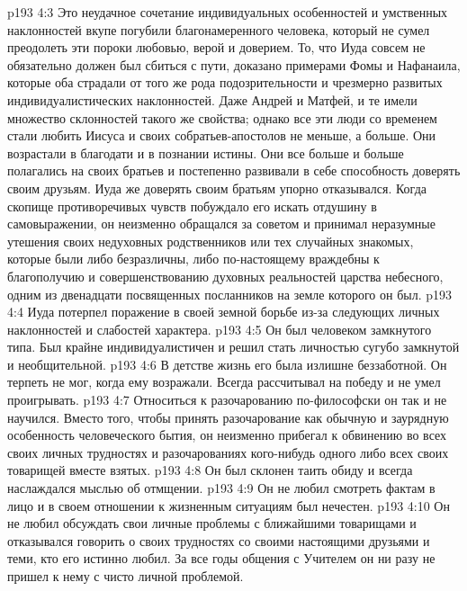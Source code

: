 \vs p193 4:3 Это неудачное сочетание индивидуальных особенностей и умственных наклонностей вкупе погубили благонамеренного человека, который не сумел преодолеть эти пороки любовью, верой и доверием. То, что Иуда совсем не обязательно должен был сбиться с пути, доказано примерами Фомы и Нафанаила, которые оба страдали от того же рода подозрительности и чрезмерно развитых индивидуалистических наклонностей. Даже Андрей и Матфей, и те имели множество склонностей такого же свойства; однако все эти люди со временем стали любить Иисуса и своих собратьев\hyp{}апостолов не меньше, а больше. Они возрастали в благодати и в познании истины. Они все больше и больше полагались на своих братьев и постепенно развивали в себе способность доверять своим друзьям. Иуда же доверять своим братьям упорно отказывался. Когда скопище противоречивых чувств побуждало его искать отдушину в самовыражении, он неизменно обращался за советом и принимал неразумные утешения своих недуховных родственников или тех случайных знакомых, которые были либо безразличны, либо по\hyp{}настоящему враждебны к благополучию и совершенствованию духовных реальностей царства небесного, одним из двенадцати посвященных посланников на земле которого он был.
\vs p193 4:4 Иуда потерпел поражение в своей земной борьбе из\hyp{}за следующих личных наклонностей и слабостей характера.
\vs p193 4:5 \bibnobreakspace Он был человеком замкнутого типа. Был крайне индивидуалистичен и решил стать личностью сугубо замкнутой и необщительной.
\vs p193 4:6 \pc {}\bibnobreakspace В детстве жизнь его была излишне беззаботной. Он терпеть не мог, когда ему возражали. Всегда рассчитывал на победу и не умел проигрывать.
\vs p193 4:7 \pc {}\bibnobreakspace Относиться к разочарованию по\hyp{}философски он так и не научился. Вместо того, чтобы принять разочарование как обычную и заурядную особенность человеческого бытия, он неизменно прибегал к обвинению во всех своих личных трудностях и разочарованиях кого\hyp{}нибудь одного либо всех своих товарищей вместе взятых.
\vs p193 4:8 \pc {}\bibnobreakspace Он был склонен таить обиду и всегда наслаждался мыслью об отмщении.
\vs p193 4:9 \pc {}\bibnobreakspace Он не любил смотреть фактам в лицо и в своем отношении к жизненным ситуациям был нечестен.
\vs p193 4:10 \pc {}\bibnobreakspace Он не любил обсуждать свои личные проблемы с ближайшими товарищами и отказывался говорить о своих трудностях со своими настоящими друзьями и теми, кто его истинно любил. За все годы общения с Учителем он ни разу не пришел к нему с чисто личной проблемой.

